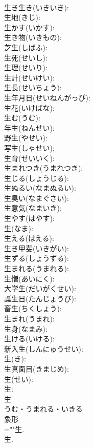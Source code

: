 \documentclass[8pt]{extreport}
\begin{document}
\begin{CJK}{UTF8}{min}
\\	生き生き(いきいき): 
\\	生地(きじ): 
\\	生かす(いかす): 
\\	生き物(いきもの): 
\\	芝生(しばふ): 
\\	生死(せいし): 
\\	生理(せいり): 
\\	生計(せいけい): 
\\	生長(せいちょう): 
\\	生年月日(せいねんがっぴ): 
\\	生花(いけばな): 
\\	生む(うむ): 
\\	年生(ねんせい): 
\\	野生(やせい): 
\\	写生(しゃせい): 
\\	生育(せいいく): 
\\	生まれつき(うまれつき): 
\\	生じる(しょうじる): 
\\	生ぬるい(なまぬるい): 
\\	生臭い(なまぐさい): 
\\	生意気(なまいき): 
\\	生やす(はやす): 
\\	生(なま): 
\\	生える(はえる): 
\\	生き甲斐(いきがい): 
\\	生ずる(しょうずる): 
\\	生まれる(うまれる): 
\\	生憎(あいにく): 
\\	大学生(だいがくせい): 
\\	誕生日(たんじょうび): 
\\	畜生(ちくしょう): 
\\	生まれ(うまれ): 
\\	生身(なまみ): 
\\	生ける(いける): 
\\	新入生(しんにゅうせい): 
\\	生(き): 
\\	生真面目(きまじめ): 
\\	生(せい): 
\\	生: 
\\	生	
\\	うむ・うまれる・いきる	
\\	象形 
\\	=""生.
\\	生.

\end{CJK}
\end{document}
